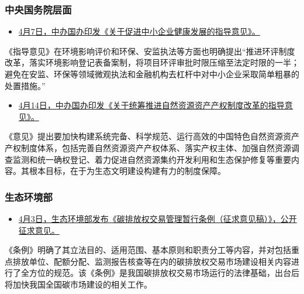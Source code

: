 \documentclass[
]{book}
\providecommand{\tightlist}{%
  \setlength{\itemsep}{0pt}\setlength{\parskip}{0pt}}
\begin{document}
\hypertarget{ux4e2dux592eux56fdux52a1ux9662ux5c42ux9762-2}{%
\subsubsection*{中央国务院层面}\label{ux4e2dux592eux56fdux52a1ux9662ux5c42ux9762-2}}

\begin{itemize}
\tightlist
\item
  \href{http://www.ccps.gov.cn/xtt/201904/t20190408_130822.shtml}{4月7日，中办国办印发《关于促进中小企业健康发展的指导意见》。}
\end{itemize}

《指导意见》在环境影响评价和环保、安监执法等方面也明确提出``推进环评制度改革，落实环境影响登记表备案制，将项目环评审批时限压缩至法定时限的一半；避免在安监、环保等领域微观执法和金融机构去杠杆中对中小企业采取简单粗暴的处置措施。''

\begin{itemize}
\tightlist
\item
  \href{http://www.gov.cn/xinwen/2019-04/14/content_5382818.htm}{4月14日，中办国办印发《关于统筹推进自然资源资产产权制度改革的指导意见》。}
\end{itemize}

《意见》提出要加快构建系统完备、科学规范、运行高效的中国特色自然资源资产产权制度体系，包括完善自然资源资产产权体系、落实产权主体、加强自然资源调查监测和统一确权登记、着力促进自然资源集约开发利用和生态保护修复等重要内容。其根本目标，在于为生态文明建设构建有力的制度保障。

\hypertarget{ux751fux6001ux73afux5883ux90e8-3}{%
\subsubsection*{生态环境部}\label{ux751fux6001ux73afux5883ux90e8-3}}

\begin{itemize}
\tightlist
\item
  \href{http://fgs.mee.gov.cn/yfxzyfzzfjs/201904/t20190403_698483.shtml}{4月3日，生态环境部发布《碳排放权交易管理暂行条例（征求意见稿）》，公开征求意见。}
\end{itemize}

《条例》明确了其立法目的、适用范围、基本原则和职责分工等内容，并对包括重点排放单位、配额分配、监测报告核查等在内的碳排放权交易市场建设相关内容进行了全方位的规范。该《条例》是我国碳排放权交易市场运行的法律基础，出台后将加快我国全国碳市场建设的相关工作。
\end{document}
